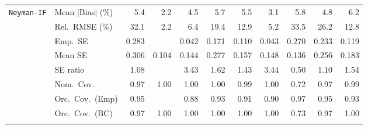 \begin{landscape}
\begin{longtable}{llrrrrrrrrr}
\addlinespace[2pt]
\quad \texttt{Neyman-IF} & Mean $|$Bias$|$ (\%) & 5.4 & \cellcolor{rankone}2.2 & \cellcolor{rankthree}4.5 & 5.7 & 5.5 & \cellcolor{ranktwo}3.1 & 5.8 & 4.8 & 6.2 \\
 & Rel.\ RMSE (\%) & 32.1 & \cellcolor{rankone}2.2 & \cellcolor{rankthree}6.4 & 19.4 & 12.9 & \cellcolor{ranktwo}5.2 & 33.5 & 26.2 & 12.8 \\
 & Emp.\ SE & 0.283 &  & 0.042 & 0.171 & 0.110 & 0.043 & 0.270 & 0.233 & 0.119 \\
 & Mean SE & 0.306 & 0.104 & 0.144 & 0.277 & 0.157 & 0.148 & 0.136 & 0.256 & 0.183 \\
 & SE ratio & \cellcolor{rankone}1.08 &  & 3.43 & 1.62 & \cellcolor{rankthree}1.43 & 3.44 & 0.50 & \cellcolor{ranktwo}1.10 & 1.54 \\
 & Nom.\ Cov. & \cellcolor{rankone}0.97 & \cellcolor{rankthree}1.00 & \cellcolor{rankthree}1.00 & \cellcolor{rankthree}1.00 & \cellcolor{ranktwo}0.99 & \cellcolor{rankthree}1.00 & 0.72 & \cellcolor{rankone}0.97 & \cellcolor{ranktwo}0.99 \\
 & Orc.\ Cov.\ (Emp) & \cellcolor{rankone}0.95 &  & 0.88 & \cellcolor{ranktwo}0.93 & \cellcolor{rankthree}0.91 & 0.90 & \cellcolor{ranktwo}0.97 & \cellcolor{rankone}0.95 & \cellcolor{ranktwo}0.93 \\
 & Orc.\ Cov.\ (BC) & \cellcolor{rankone}0.97 & \cellcolor{ranktwo}1.00 & \cellcolor{ranktwo}1.00 & \cellcolor{ranktwo}1.00 & \cellcolor{ranktwo}1.00 & \cellcolor{ranktwo}1.00 & \cellcolor{rankthree}0.73 & \cellcolor{rankone}0.97 & \cellcolor{ranktwo}1.00 \\
\addlinespace[2pt]
\end{longtable}
\end{landscape}
